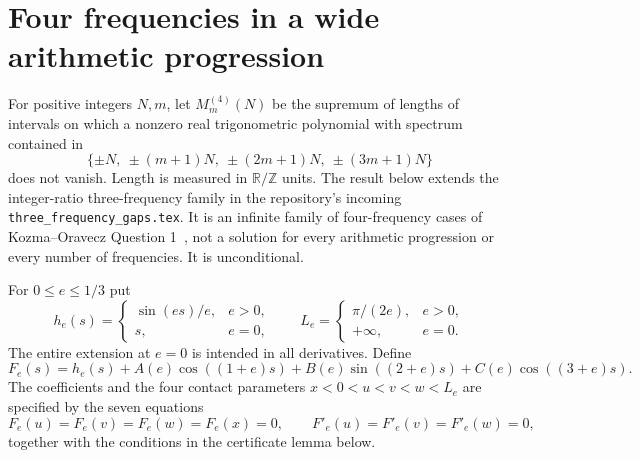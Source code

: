 \section{Four frequencies in a wide arithmetic progression}
\label{sec:four}

For positive integers $N,m$, let $M_m^{(4)}(N)$ be the supremum of lengths
of intervals on which a nonzero real trigonometric polynomial with spectrum
contained in
\[
 \{\pm N,\ \pm(m+1)N,\ \pm(2m+1)N,\ \pm(3m+1)N\}
\]
does not vanish. Length is measured in $\mathbb R/\mathbb Z$ units. The result
below extends the integer-ratio three-frequency family in the repository's
incoming \texttt{three\_frequency\_gaps.tex}. It is an infinite family of
four-frequency cases of Kozma--Oravecz Question 1~\cite{KO2003}, not a solution for every
arithmetic progression or every number of frequencies. It is unconditional.

For $0\le e\le1/3$ put
\[
 h_e(s)=\begin{cases}\sin(es)/e,&e>0,\\s,&e=0,\end{cases}
 \qquad L_e=\begin{cases}\pi/(2e),&e>0,\\+\infty,&e=0.\end{cases}
\]
The entire extension at $e=0$ is intended in all derivatives. Define
\begin{equation}\label{eq:fourF}
 F_e(s)=h_e(s)+A(e)\cos((1+e)s)+B(e)\sin((2+e)s)
                  +C(e)\cos((3+e)s).
\end{equation}
The coefficients and the four contact parameters $x<0<u<v<w<L_e$ are
specified by the seven equations
\begin{equation}\label{eq:fourcontacts}
 F_e(u)=F_e(v)=F_e(w)=F_e(x)=0,
 \qquad F'_e(u)=F'_e(v)=F'_e(w)=0,
\end{equation}
together with the conditions in the certificate lemma below.


